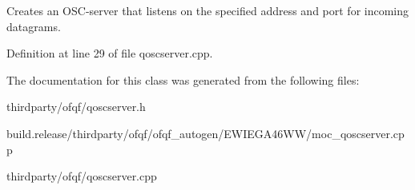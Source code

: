 Creates an O\+S\+C-\/server that listens on the specified address and port for incoming datagrams. 

Definition at line 29 of file qoscserver.\+cpp.



The documentation for this class was generated from the following files\+:\begin{DoxyCompactItemize}
\item 
thirdparty/ofqf/qoscserver.\+h\item 
build.\+release/thirdparty/ofqf/ofqf\+\_\+autogen/\+E\+W\+I\+E\+G\+A46\+W\+W/moc\+\_\+qoscserver.\+cpp\item 
thirdparty/ofqf/qoscserver.\+cpp\end{DoxyCompactItemize}
